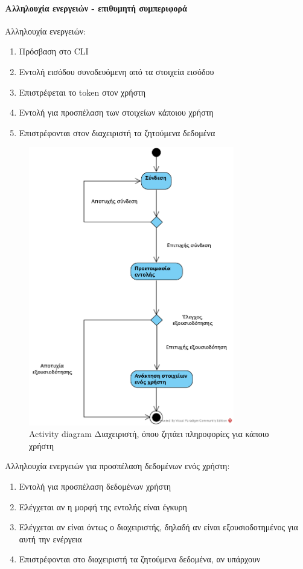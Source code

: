 \documentclass[a4paper,12pt, oneside]{article}
\begin{document}
\paragraph{Αλληλουχία ενεργειών - επιθυμητή συμπεριφορά}
Αλληλουχία ενεργειών: \\
\begin{enumerate}
	\item Πρόσβαση στο \textlatin{CLI}
	\item Εντολή εισόδου συνοδευόμενη από τα στοιχεία εισόδου
	\item Επιστρέφεται το token στον χρήστη
	\item Εντολή για προσπέλαση των στοιχείων κάποιου χρήστη
	\item Επιστρέφονται στον διαχειριστή τα ζητούμενα δεδομένα
\end{enumerate} 

\begin{figure}[h]
\includegraphics[width=0.8\textwidth]{./UML/Activity_Diagram_Admin_fetch_userstatus.png}
\caption{\textlatin{Activity diagram} Διαχειριστή, όπου ζητάει πληροφορίες για κάποιο χρήστη}
\centering
\end{figure}
\clearpage


Αλληλουχία ενεργειών για προσπέλαση δεδομένων ενός χρήστη: \\
\begin{enumerate}
	\item Εντολή για προσπέλαση δεδομένων χρήστη
	\item Ελέγχεται αν η μορφή της εντολής είναι έγκυρη
	\item Ελέγχεται αν είναι όντως ο διαχειριστής, δηλαδή αν είναι εξουσιοδοτημένος για αυτή την ενέργεια
	\item Επιστρέφονται στο διαχειριστή τα ζητούμενα δεδομένα, αν υπάρχουν
\end{enumerate} 
\end{document}
